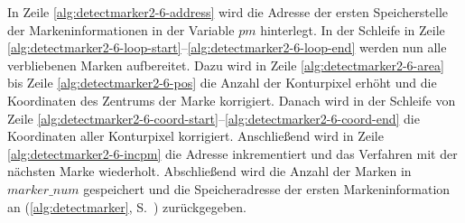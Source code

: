 In Zeile \ref{alg:detectmarker2-6-address} wird die Adresse der ersten Speicherstelle der Markeninformationen in der
 Variable $\mathit{pm}$ hinterlegt. In der Schleife in Zeile
 \ref{alg:detectmarker2-6-loop-start}--\ref{alg:detectmarker2-6-loop-end} werden nun alle verbliebenen Marken
 aufbereitet. Dazu wird in Zeile \ref{alg:detectmarker2-6-area} bis Zeile \ref{alg:detectmarker2-6-pos} die Anzahl der
 Konturpixel erhöht und die Koordinaten des Zentrums der Marke korrigiert. Danach wird in der Schleife von Zeile
 \ref{alg:detectmarker2-6-coord-start}--\ref{alg:detectmarker2-6-coord-end} die Koordinaten aller Konturpixel
 korrigiert. Anschließend wird in Zeile \ref{alg:detectmarker2-6-incpm} die Adresse inkrementiert und das Verfahren mit
 der nächsten Marke wiederholt. Abschließend wird die Anzahl der Marken in $\mathit{marker\_num}$ gespeichert und die
 Speicheradresse der ersten Markeninformation an  (\autoref{alg:detectmarker},
 S.~\pageref{alg:detectmarker}) zurückgegeben.